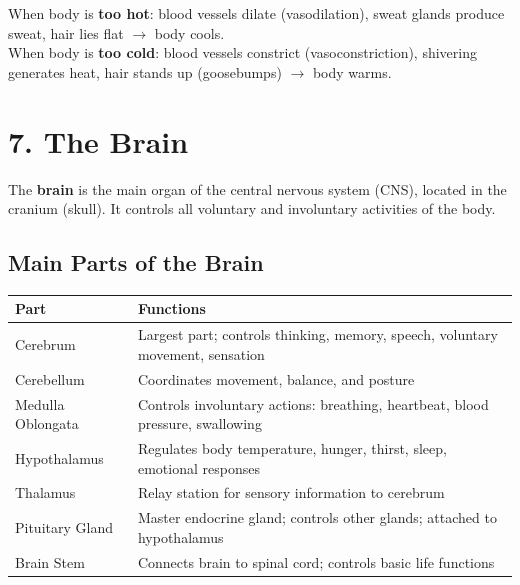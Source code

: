 \documentclass[12pt]{article}
\newcommand{\hcell}[1]{\textbf{\color{white}#1}}
\begin{document}
\begin{thmbox}[Thermoregulation]
When body is \textbf{too hot}: blood vessels dilate (vasodilation), sweat glands produce sweat, hair lies flat $\to$ body cools.\\[4pt]
When body is \textbf{too cold}: blood vessels constrict (vasoconstriction), shivering generates heat, hair stands up (goosebumps) $\to$ body warms.
\end{thmbox}

\section{7. The Brain}

\begin{defbox}[Brain]
The \textbf{brain} is the main organ of the central nervous system (CNS), located in the cranium (skull). It controls all voluntary and involuntary activities of the body.
\end{defbox}

\subsection{Main Parts of the Brain}

\begin{center}
\renewcommand{\arraystretch}{1.5}
\begin{tabular}{|C{3.5cm}|C{9cm}|}
\hline
{}\hcell{Part} & \hcell{Functions} \\
\hline
Cerebrum & Largest part; controls thinking, memory, speech, voluntary movement, sensation \\
 Cerebellum & Coordinates movement, balance, and posture \\
Medulla Oblongata & Controls involuntary actions: breathing, heartbeat, blood pressure, swallowing \\
 Hypothalamus & Regulates body temperature, hunger, thirst, sleep, emotional responses \\
Thalamus & Relay station for sensory information to cerebrum \\
 Pituitary Gland & Master endocrine gland; controls other glands; attached to hypothalamus \\
Brain Stem & Connects brain to spinal cord; controls basic life functions \\
\hline
\end{tabular}
\end{center}
\end{document}
